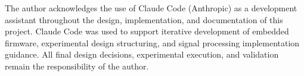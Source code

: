 The author acknowledges the use of Claude Code (Anthropic) as a development assistant
throughout the design, implementation, and documentation of this project. Claude Code was
used to support iterative development of embedded firmware, experimental design structuring,
and signal processing implementation guidance. All final design decisions, experimental
execution, and validation remain the responsibility of the author.